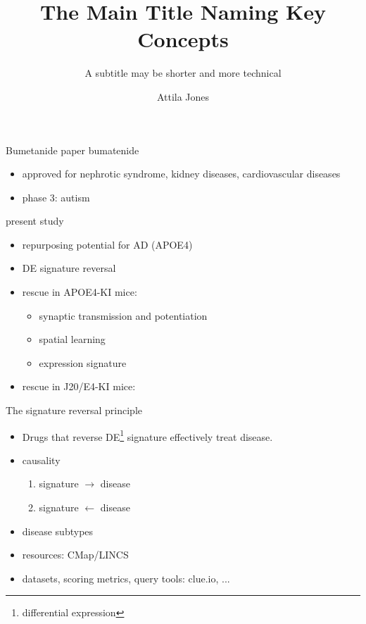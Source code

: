 \documentclass{beamer}
\title{The Main Title Naming Key Concepts}
\subtitle{A subtitle may be shorter and more technical}
\author{Attila Jones}
\date{}
\begin{document}
\begin{frame}{Bumetanide paper}
bumatenide
\begin{itemize}
\item approved for nephrotic syndrome, kidney diseases, cardiovascular
  diseases
\item phase 3: autism
\end{itemize}
\vfill
present study
\begin{itemize}
\item repurposing potential for AD (APOE4)
\item DE signature reversal
\item rescue in APOE4-KI mice:
\begin{itemize}
\item synaptic transmission and potentiation
\item spatial learning
\item expression signature
\end{itemize}
\item rescue in J20/E4-KI mice:
\end{itemize}
\end{frame}

\begin{frame}{The signature reversal principle}
\begin{itemize}
\item \alert{Drugs that reverse DE\footnote{differential expression} signature
	effectively treat disease.}
\item causality
\begin{enumerate}
	\item signature $\rightarrow$ disease
	\item signature $\leftarrow$ disease
\end{enumerate}
\item disease subtypes
\end{itemize}
\vfill
\begin{itemize}
\item resources: CMap/LINCS
\item datasets, scoring metrics, query tools: clue.io, ...
\end{itemize}
\end{frame}
\end{document}

